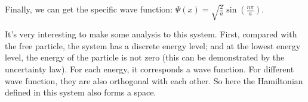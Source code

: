 Finally, we can get the specific wave function: $\Psi (x) =
\sqrt{\frac{2}{a}} \sin (\frac{n\pi}{a})$.

It's very interesting to make some analysis to this system. First,
compared with the free particle, the system has a discrete energy
level; and at the lowest energy level, the energy of the particle is
not zero (this can be demonstrated by the uncertainty law).  For
each energy, it corresponds a wave function. For different wave
function, they are also orthogonal with each other. So here the
Hamiltonian defined in this system also forms a space.





